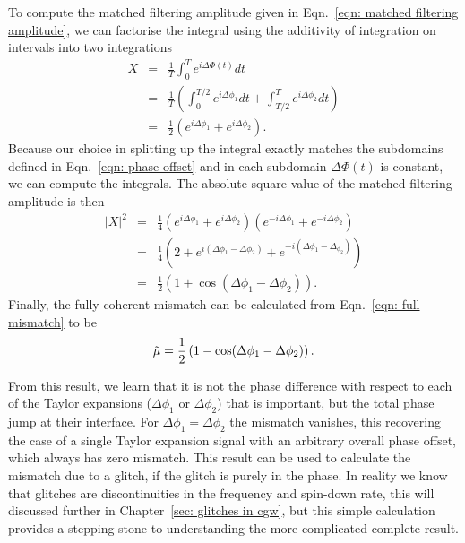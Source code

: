 \documentclass[../full_thesis/full_thesis.tex]{subfiles}
\begin{document}
To compute the matched filtering amplitude given in Eqn.~\eqref{eqn: matched
filtering amplitude}, we can factorise the integral using the additivity of
integration on intervals into two integrations
\begin{eqnarray}
X & = &\frac{1}{T } \int_{0}^{T}e^{i\Delta\Phi(t)} dt\\
 & = &\frac{1}{T }\left(\int_{0}^{T /2}e^{i\Delta\phi_{1}} dt  +
\int_{T/2}^{T} e^{i\Delta\phi_{2}}dt\right)\\
& = & \frac{1}{2}\left(e^{i\Delta\phi_{1}} + e^{i\Delta\phi_{2}}\right).
\end{eqnarray}
Because our choice in splitting up the integral exactly matches the subdomains
defined in Eqn.~\eqref{eqn: phase offset} and in each subdomain $\Delta\Phi(t)$
is constant, we can compute the integrals.
The absolute square value of the matched filtering amplitude is then
\begin{eqnarray}
|X|^{2}& = &\frac{1}{4}\left(e^{i\Delta\phi_{1}} + e^{i\Delta\phi_{2}}\right) \left(e^{-i\Delta\phi_{1}} + e^{-i\Delta\phi_{2}}\right)\\
& = &\frac{1}{4} \left(2 + e^{i(\Delta\phi_{1} - \Delta \phi_{2})} +  e^{-i(\Delta\phi_{1} - \Delta_{\phi_{2}})} \right) \\
& = &\frac{1}{2}\left(1 + \cos(\Delta\phi_{1} - \Delta\phi_{2})\right).
\end{eqnarray}
Finally, the fully-coherent mismatch can be calculated from Eqn.~\eqref{eqn: full mismatch}
to be
\begin{equation}
\tilde{\mu} = \frac{1}{2}\left(1 - \cos(\Delta\phi_{1} - \Delta\phi_{2})\right).
\label{eqn: two segment phase mismatch}
\end{equation}

From this result, we learn that it is not the phase difference with respect to
each of the Taylor expansions ($\Delta\phi_1$ or $\Delta\phi_2$) that is
important, but the total phase jump at their interface. For $\Delta \phi_{1} =
\Delta \phi_{2}$ the mismatch vanishes, this recovering the case of a single
Taylor expansion signal with an arbitrary overall phase offset, which always has
zero mismatch. This result can be used to calculate the mismatch due to a glitch,
if the glitch is purely in the phase. In reality we know that glitches are
discontinuities in the frequency and spin-down rate, this will discussed further
in Chapter~\ref{sec: glitches in cgw}, but this simple calculation provides
a stepping stone to understanding the more complicated complete result.
\end{document}
